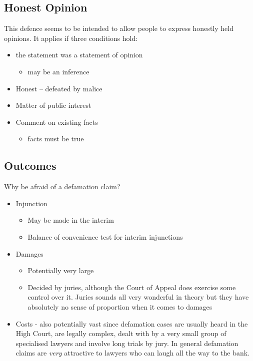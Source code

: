 \documentclass[]{article}
\begin{document}
\subsection{Honest Opinion}
This defence seems to be intended to allow people to express honestly held opinions. It applies if three conditions hold:

\begin{itemize}
\item the statement was a statement of opinion 

  \begin{itemize}
  \item
    may be an inference
  \end{itemize}
\item
  Honest -- defeated by malice
\item
  Matter of public interest
\item
  Comment on existing facts

  \begin{itemize}
  \item
    facts must be true
  \end{itemize}
\end{itemize}

\subsection{Outcomes}

Why be afraid of a defamation claim?

\begin{itemize}
\item
  Injunction

  \begin{itemize}
  \item
    May be made in the interim
  \item
    Balance of convenience test for interim injunctions
  \end{itemize}
\item
  Damages

  \begin{itemize}
  \item
    Potentially very large
  \item
    Decided by juries, although the Court of Appeal does exercise some
    control over it. Juries sounds all very wonderful in theory but they
    have absolutely no sense of proportion when it comes to damages
  \end{itemize}
\item
  {{Costs - also potentially vast since defamation cases are usually
  heard in the High Court, are legally complex, dealt with by a very
  small group of specialised lawyers and involve long trials by jury. In
  general defamation claims are }}\emph{{very }}{{attractive to lawyers
  who can laugh all the way to the bank.}}
\end{itemize}
\end{document}
